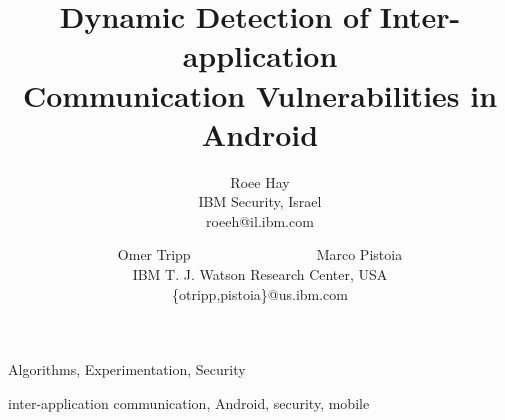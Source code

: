 \documentclass[pldi]{sig-alternate}
\begin{document}
	

\title{Dynamic Detection of Inter-application\\Communication Vulnerabilities in Android}

\author{
		Roee Hay \\
		IBM Security, Israel \\
		{\Large \textsf{roeeh@il.ibm.com}}
		\and
		Omer Tripp~~~~~~~~~~~~~~~~~~Marco Pistoia\\
		IBM T. J. Watson Research Center, USA \\
		{\Large \textsf{\{otripp,pistoia\}@us.ibm.com}}
}

\maketitle




\terms
Algorithms, Experimentation, Security

\keywords
inter-application communication, Android, security, mobile











%

%



%






\balance



\end{document}
